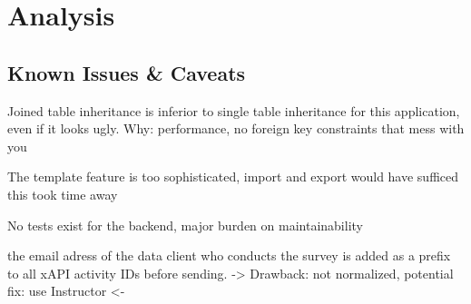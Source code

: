 \section{Analysis}
    \subsection{Known Issues \& Caveats}
        Joined table inheritance is inferior to single table inheritance
        for this application, even if it looks ugly. Why: performance,
        no foreign key constraints that mess with you

        The template feature is too sophisticated, import and export would have sufficed
        this took time away

        No tests exist for the backend, major burden on maintainability

         the email adress of the data client who conducts the survey
    is added as a prefix to all xAPI activity IDs before sending.
    -> Drawback: not normalized, potential fix: use Instructor <-
